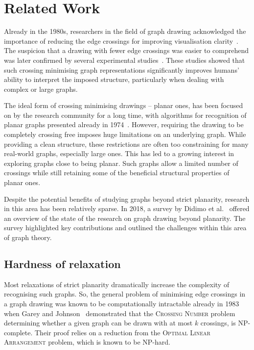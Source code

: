 \chapter{Related Work}\label{ch:related-work}

Already in the 1980s, researchers in the field of graph drawing acknowledged the importance of reducing the edge crossings for improving visualisation clarity~\cite{early-few-crossing}. The suspicion that a drawing with fewer edge crossings was easier to comprehend was later confirmed by several experimental studies~\cite{graph-aesthetic-survey}. These studies showed that such crossing minimising graph representations significantly improves humans’ ability to interpret the imposed structure, particularly when dealing with complex or large graphs.

The ideal form of crossing minimising drawings -- planar ones, has been focused on by the research community for a long time, with algorithms for recognition of planar graphs presented already in 1974~\cite{linear-p}. However, requiring the drawing to be completely crossing free imposes huge limitations on an underlying graph. While providing a clean structure, these restrictions are often too constraining for many real-world graphs, especially large ones. This has led to a growing interest in exploring graphs close to being planar. Such graphs allow a limited number of crossings while still retaining some of the beneficial structural properties of planar ones.

Despite the potential benefits of studying graphs beyond strict planarity, research in this area has been relatively sparse. In 2018, a survey by Didimo et al.~\cite{beyond-planarity-survey} offered an overview of the state of the research on graph drawing beyond planarity. The survey highlighted key contributions and outlined the challenges within this area of graph theory.

\section{Hardness of relaxation}\label{sec:hardness-of-relaxation}

Most relaxations of strict planarity dramatically increase the complexity of recognising such graphs. So, the general problem of minimising edge crossings in a graph drawing was known to be computationally intractable already in 1983 when Garey and Johnson~\cite{cr_NPC} demonstrated that the \textsc{Crossing Number} problem determining whether a given graph can be drawn with at most \(k\) crossings, is NP-complete. Their proof relies on a reduction from the \textsc{Optimal Linear Arrangement} problem, which is known to be NP-hard.

